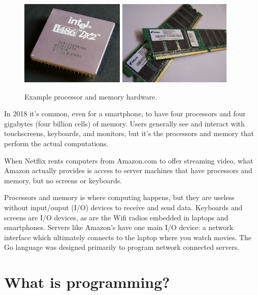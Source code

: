 \begin{figure}[!ht]
\begin{center}
\includegraphics[height=11em]{figs/CPU.jpg}
\hspace{2em}
\includegraphics[height=11em]{figs/RAM.jpg}
\caption{Example processor and memory hardware.}
\label{fig.cpuram}
\end{center}
\end{figure}

In 2018 it's common, even for a smartphone, to have four processors and four gigabytes (four billion cells) of memory.
Users generally see and interact with touchscreens, keyboards, and monitors, but it's the processors and memory that perform the actual computations.

When Netflix rents computers from Amazon.com to offer streaming video,
what Amazon actually provides is access to server machines that have processors and memory, but no screens or keyboards.

Processors and memory is where computing happens, but they are useless without input/ouput (I/O) devices to receive and send data.
Keyboards and screens are I/O devices, as are the Wifi radios embedded in laptops and smartphones.
Servers like Amazon's have one main I/O device: a network interface which ultimately connects to the laptop where you watch movies.
The Go language was designed primarily to program network connected servers.


\section{What is programming?}

